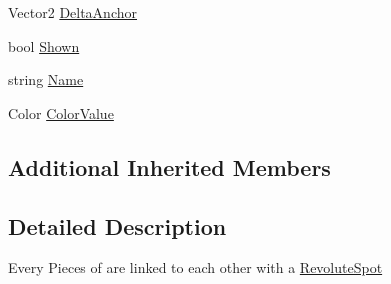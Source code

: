\begin{DoxyCompactItemize}
Vector2 \hyperlink{classgearit_1_1src_1_1robot_1_1_revolute_spot_aae43efd0acd982066e3e2fe90a66c117}{Delta\+Anchor}
\item 
bool \hyperlink{classgearit_1_1src_1_1robot_1_1_revolute_spot_a0f33ef11a1eb1accc6de38ad16d9af96}{Shown}
\item 
string \hyperlink{classgearit_1_1src_1_1robot_1_1_revolute_spot_a089c88ae435fc5585d96db0ffeabc73c}{Name}
\item 
Color \hyperlink{classgearit_1_1src_1_1robot_1_1_revolute_spot_a066a5e5de8cb2b1cab36a67be4a393e8}{Color\+Value}
\end{DoxyCompactItemize}
\subsection*{Additional Inherited Members}


\subsection{Detailed Description}
Every Pieces of are linked to each other with a \hyperlink{classgearit_1_1src_1_1robot_1_1_revolute_spot}{Revolute\+Spot} 



